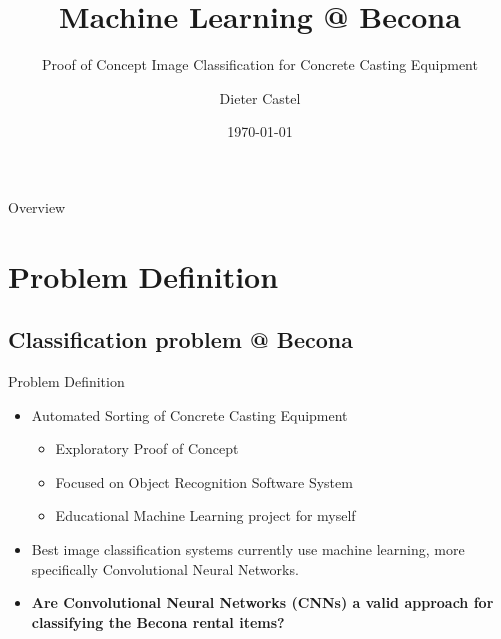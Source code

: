 \documentclass{beamer}
\title{Machine Learning @ Becona}
\subtitle{Proof of Concept Image Classification for Concrete Casting Equipment}
\author{Dieter Castel}
\date{\today}
\begin{document}
\begin{frame}
  \titlepage
\end{frame}

\begin{frame}{Overview}
\tableofcontents
\end{frame}

\section{Problem Definition}
\subsection{Classification problem @ Becona}
\begin{frame}{Problem Definition}
  \begin{itemize}
	    \item Automated Sorting of Concrete Casting Equipment 
	    \begin{itemize}
	      \item Exploratory Proof of Concept 
	      \item Focused on Object Recognition Software System
	      \item Educational Machine Learning project for myself 
	    \end{itemize}
	    \item Best image classification systems currently use machine learning, more specifically Convolutional Neural Networks.
	    \item \textbf{Are Convolutional Neural Networks (CNNs) a valid approach for classifying the Becona rental items?}
  \end{itemize}
\end{frame}
\end{document}
